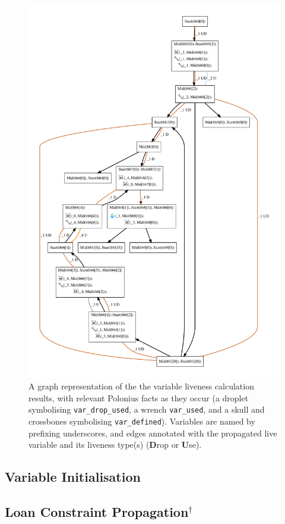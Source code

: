\documentclass[11pt,a4paper,twoside,openany]{report}
\newcommand{\notmine}[0] {$^\dagger$}
\newcommand{\InDatalog}[1]{\texttt{#1}}
\begin{document}
\begin{figure}
  \includegraphics[width=0.9\linewidth]{Graphs/liveness.pdf}
  \caption{A graph representation of the the variable liveness calculation
    results, with relevant Polonius facts as they occur (a droplet symbolising
    \InDatalog{var_drop_used}, a wrench \InDatalog{var_used}, and a skull and
    crossbones symbolising \InDatalog{var_defined}). Variables are named by
    prefixing underscores, and edges annotated with the propagated live variable
    and its liveness type(s) (\textbf{D}rop or \textbf{U}se).}
  \label{fig:liveness-graph}
\end{figure}

\subsection{Variable Initialisation}
\label{sec:var-initalisation}


\subsection{Loan Constraint Propagation\notmine{}}
\end{document}
